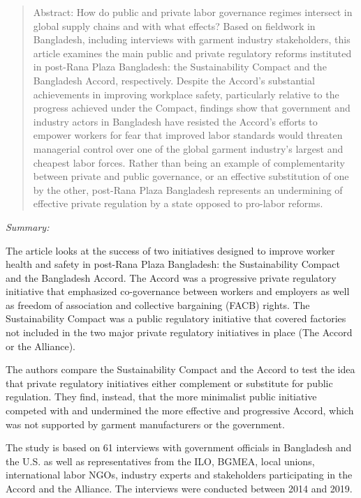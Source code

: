 \documentclass[
  12pt,
]{article}
\begin{document}
\bigbreak


\begin{quote}
Abstract: 
How do public and private labor governance regimes intersect in global supply chains and with what effects? Based on fieldwork in Bangladesh, including interviews with garment industry stakeholders, this article examines the main public and private regulatory reforms instituted in post-Rana Plaza Bangladesh: the Sustainability Compact and the Bangladesh Accord, respectively. Despite the Accord's substantial achievements in improving workplace safety, particularly relative to the progress achieved under the Compact, findings show that government and industry actors in Bangladesh have resisted the Accord's efforts to empower workers for fear that improved labor standards would threaten managerial control over one of the global garment industry's largest and cheapest labor forces. Rather than being an example of complementarity between private and public governance, or an effective substitution of one by the other, post-Rana Plaza Bangladesh represents an undermining of effective private regulation by a state opposed to pro-labor reforms.
\end{quote}

\emph{Summary:}

The article looks at the success of two initiatives designed to improve
worker health and safety in post-Rana Plaza Bangladesh: the
Sustainability Compact and the Bangladesh Accord. The Accord was a
progressive private regulatory initiative that emphasized co-governance
between workers and employers as well as freedom of association and
collective bargaining (FACB) rights. The Sustainability Compact was a
public regulatory initiative that covered factories not included in the
two major private regulatory initiatives in place (The Accord or the
Alliance).

The authors compare the Sustainability Compact and the Accord to test
the idea that private regulatory initiatives either complement or
substitute for public regulation. They find, instead, that the more
minimalist public initiative competed with and undermined the more
effective and progressive Accord, which was not supported by garment
manufacturers or the government.

The study is based on 61 interviews with government officials in
Bangladesh and the U.S. as well as representatives from the ILO, BGMEA,
local unions, international labor NGOs, industry experts and
stakeholders participating in the Accord and the Alliance. The
interviews were conducted between 2014 and 2019.
\end{document}
